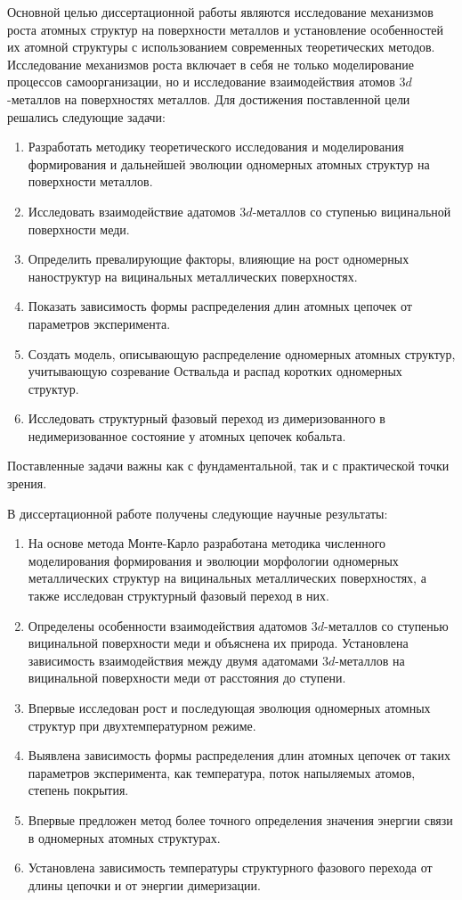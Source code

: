 Основной целью диссертационной работы являются исследование механизмов роста атомных структур на поверхности металлов и установление особенностей их атомной структуры с использованием современных теоретических методов. Исследование механизмов роста включает в себя не только моделирование процессов самоорганизации, но и исследование взаимодействия атомов $3d$-металлов на поверхностях металлов. Для достижения поставленной цели решались следующие задачи:
\begin{enumerate}
	\item Разработать методику теоретического исследования и моделирования  формирования и дальнейшей эволюции одномерных атомных структур на поверхности металлов.
	\item Исследовать взаимодействие адатомов $3d$-металлов со ступенью вицинальной поверхности меди.
	\item Определить превалирующие факторы, влияющие на рост одномерных наноструктур на вицинальных металлических поверхностях.
	\item Показать зависимость формы распределения длин атомных цепочек от параметров эксперимента.
	\item Создать модель, описывающую распределение одномерных атомных структур, учитывающую созревание Оствальда и распад коротких одномерных структур.
	\item Исследовать структурный фазовый переход из димеризованного в недимеризованное состояние у атомных цепочек кобальта.
\end{enumerate}

Поставленные задачи важны как с фундаментальной, так и с практической точки зрения.


В диссертационной работе получены следующие научные результаты:
\begin{enumerate}
	\item На основе метода Монте-Карло разработана методика численного моделирования формирования и эволюции морфологии одномерных металлических структур на вицинальных металлических поверхностях, а также исследован структурный фазовый переход в них.
	\item Определены особенности взаимодействия адатомов $3d$-металлов со ступенью вицинальной поверхности меди и объяснена их природа. Установлена зависимость взаимодействия между двумя адатомами $3d$-металлов на вицинальной поверхности меди от расстояния до ступени.
	\item Впервые исследован рост и последующая эволюция одномерных атомных структур при двухтемпературном режиме.
	\item Выявлена зависимость формы распределения длин атомных цепочек от таких параметров эксперимента, как температура, поток напыляемых атомов, степень покрытия.
	\item Впервые предложен метод более точного определения значения энергии связи в одномерных атомных структурах.
	\item Установлена зависимость температуры структурного фазового перехода от длины цепочки  и от энергии димеризации.
\end{enumerate}





